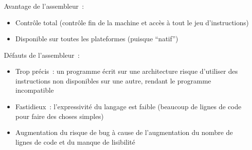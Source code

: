\begin{frame}
  \frametitle{\secname}
  \framesubtitle{\subsecname}
  Avantage de l'assembleur~:
  \begin{itemize}
    \item Contrôle total (contrôle fin de la machine et accès à tout le jeu d'instructions)
    \item Disponible sur toutes les plateformes (puisque ``natif'')
  \end{itemize}
  Défauts de l'assembleur~:
  \begin{itemize}
    \item Trop précis~: un programme écrit sur une architecture risque d'utiliser des instructions non disponibles sur une autre, rendant le programme incompatible
    \item Fastidieux~: l'expressivité du langage est faible (beaucoup de lignes de code pour faire des choses simples)
    \item Augmentation du risque de bug à cause de l'augmentation du nombre de lignes de code et du manque de lisibilité
  \end{itemize}
\end{frame}

